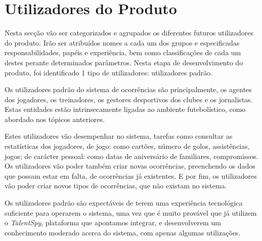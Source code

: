 \section{Utilizadores do Produto}

Nesta secção vão ser categorizados e agrupados os diferentes futuros utilizadores do produto. Irão ser atribuídos nomes a cada um dos grupos e especificadas responsabilidades, papéis e experiência, bem como classificações de cada um destes perante determinados parâmetros. Nesta etapa de desenvolvimento do produto, foi identificado 1 tipo de utilizadores: utilizadores padrão.

Os utilizadores padrão do sistema de ocorrências são principalmente, os agentes dos jogadores, os treinadores, os gestores desportivos dos clubes e os jornalistas. Estas entidades estão intrinsecamente ligadas ao ambiente futebolístico, como abordado nos tópicos anteriores.

Estes utilizadores vão desempenhar no sistema, tarefas como consultar as estatísticas dos jogadores, de jogo: como cartões, número de golos, assistências, jogos; de carácter pessoal: como datas de aniversário de familiares, compromissos. Os utilizadores vão poder também criar novas ocorrências, preenchendo os dados que possam estar em falta, de ocorrências já existentes. E por fim, os utilizadores vão poder criar novos tipos de ocorrências, que não existam no sistema.

Os utilizadores padrão são expectáveis de terem uma experiência tecnológica suficiente para operarem o sistema, uma vez que é muito provável que já utilizem o \emph{TalentSpy}, plataforma que apontamos integrar, e desenvolverem um conhecimento moderado acerca do sistema, com apenas algumas utilizações.
